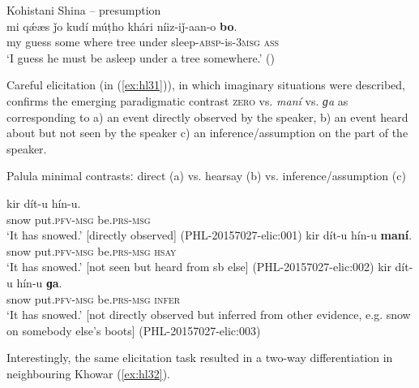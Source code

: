 \documentclass[output=paper]{langsci/langscibook}
\begin{document}
\begin{exe}
\ex Kohistani Shina -- presumption \label{ex:hl30}\\
	\gll mi qǽæs ǰo kudí múṭho khári níiz-iǰ-aan-o \textbf{bo}.\\
	my guess some where tree under sleep-\textsc{absp}-is-3\textsc{msg} \textsc{ass}\\
	\trans ‘I guess he must be asleep under a tree somewhere.’ (\citealt[204]{SchmidtKohistani2008})
\end{exe}

Careful elicitation (in ‎(\ref{ex:hl31})), in which imaginary situations were described, confirms the emerging paradigmatic contrast \textsc{zero} vs. \textit{maní} vs. \textit{ɡa} as corresponding to a) an event directly observed by the speaker, b) an event heard about but not seen by the speaker c) an inference/assumption on the part of the speaker.

\begin{exe}
\ex Palula minimal contrastsː direct (a) vs. hearsay (b) vs. inference/assumption (c) \label{ex:hl31}\\
	\begin{xlist}
	\ex 
	\gll kir  dít-u hín-u.\\
	snow put.\textsc{pfv}-\textsc{msg} be.\textsc{prs}-\textsc{msg}\\
	\trans ‘It has snowed.’ [directly observed] (PHL-20157027-elic:001)
	\ex 
	\gll kir dít-u hín-u \textbf{maní}.\\
	snow put.\textsc{pfv}-\textsc{msg} be.\textsc{prs}-\textsc{msg} \textsc{hsay}\\
	\trans ‘It has snowed.’ [not seen but heard from sb else] (PHL-20157027-elic:002)
	\ex kir dít-u hín-u \textbf{ɡa}.\\
	snow put.\textsc{pfv}-\textsc{msg} be.\textsc{prs}-\textsc{msg} \textsc{infer}\\
	\trans ‘It has snowed.’ [not directly observed but inferred from other evidence, e.g. snow on somebody else’s boots] (PHL-20157027-elic:003)
	\end{xlist}
\end{exe}

Interestingly, the same elicitation task resulted in a two-way differentiation in neighbouring Khowar ‎(\ref{ex:hl32}).
\end{document}
